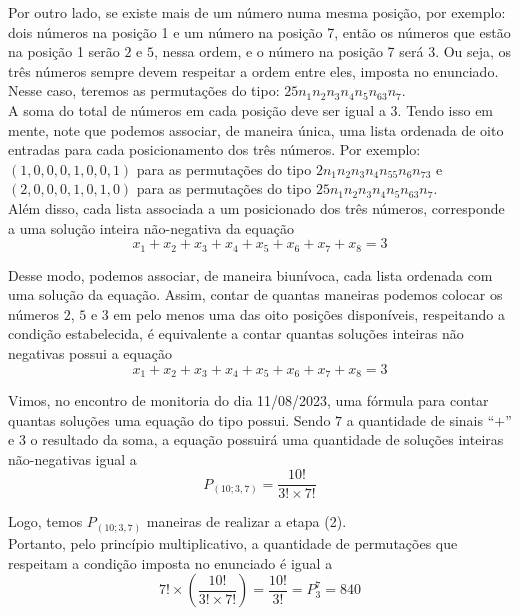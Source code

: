 \documentclass[12pt, a4paper]{article}
\begin{document}
Por outro lado, se existe mais de um número numa mesma posição, por exemplo: dois números na posição 1 e um número na posição 7, então os números que estão na posição 1 serão \(2\) e \(5\), nessa ordem, e o número na posição 7 será \(3\). Ou seja, os três números sempre devem  respeitar a ordem entre eles, imposta no enunciado. Nesse caso, teremos as permutações do tipo: \(25n_1n_2n_3n_4n_5n_63n_7\). \\

A soma do total de números em cada posição deve ser igual a \(3\). Tendo isso em mente, note que podemos associar, de maneira única, uma lista ordenada de oito entradas para cada posicionamento dos três números. Por exemplo: \((1, 0,0,0,1,0,0,1)\) para as permutações do tipo \(2n_1n_2n_3n_4n_55n_6n_73\) e \((2, 0,0,0,1,0,1,0)\) para as permutações do tipo \(25n_1n_2n_3n_4n_5n_63n_7\).   \\

Além disso, cada lista associada a um posicionado dos três números, corresponde a uma solução inteira não-negativa da equação \[x_1 + x_2 + x_3 + x_4+x_5 + x_6 + x_7 + x_8=3\]

Desse modo, podemos associar, de maneira biunívoca, cada lista ordenada com uma solução da equação. Assim, contar de quantas maneiras podemos colocar os números \(2\), \(5\) e \(3\) em pelo menos uma das oito posições disponíveis, respeitando a condição estabelecida, é equivalente a contar quantas soluções inteiras não negativas possui a equação \[x_1 + x_2 + x_3 + x_4+x_5 + x_6 + x_7 + x_8=3\]

Vimos, no encontro de monitoria do dia 11/08/2023, uma fórmula para contar quantas soluções uma equação do tipo possui. Sendo \(7\) a quantidade de sinais ``\(+\)'' e \(3\) o resultado da soma, a equação possuirá uma quantidade de soluções inteiras não-negativas igual a \[P_{(10;3, 7)} = \dfrac{10!}{3! \times 7!}\]

Logo, temos \(P_{(10;3, 7)}\) maneiras de realizar a etapa (2).\\

Portanto, pelo princípio multiplicativo, a quantidade de permutações que respeitam a condição imposta no enunciado é igual a \[7! \times \left(\dfrac{10!}{3! \times 7!}\right) = \dfrac{10!}{3!} = P^7_3 = 840\]
\end{document}
